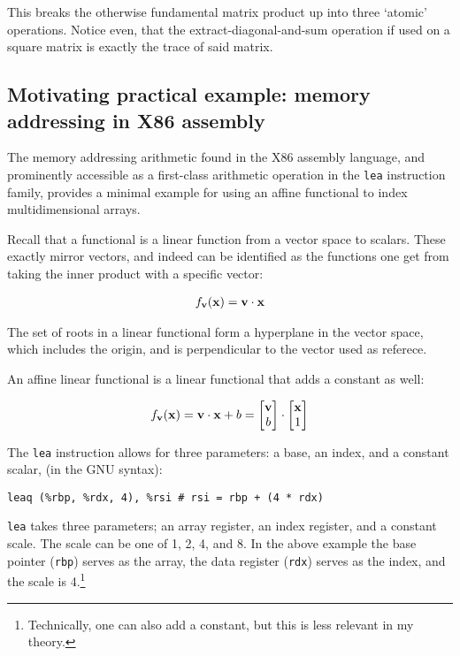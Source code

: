 \documentclass[a4paper,11pt,notitlepage]{article}
\begin{document}
This breaks the otherwise fundamental matrix product up into three `atomic' operations. Notice even,
that the extract-diagonal-and-sum operation if used on a square matrix is exactly the trace of said matrix.

\subsection{Motivating practical example: memory addressing in X86 assembly}

The memory addressing arithmetic found in the X86 assembly language, and prominently
accessible as a first-class arithmetic operation in the \texttt{lea} instruction family,
provides a minimal example for using an affine functional to index multidimensional arrays.

Recall that a functional is a linear function from a vector space to scalars. These exactly mirror
vectors, and indeed can be identified as the functions one get from taking the inner product with
a specific vector:

\begin{align*}
  f_{\bm{\mathrm{v}}}(\bm{\mathrm{x}}) = \bm{\mathrm{v}} \cdot \bm{\mathrm{x}}
\end{align*}

The set of roots in a linear functional form a hyperplane in the vector space, which includes the origin,
and is perpendicular to the vector used as referece.

An affine linear functional is a linear functional that adds a constant as well:

\begin{align*}
  f_{\bm{\mathrm{v}}}(\bm{\mathrm{x}}) = \bm{\mathrm{v}} \cdot \bm{\mathrm{x}} + b =
  \begin{bmatrix} \bm{\mathrm{v}} \\ b \end{bmatrix}\cdot\begin{bmatrix} \bm{\mathrm{x}} \\ 1 \end{bmatrix}
\end{align*}

The \texttt{lea} instruction allows for three parameters: a base, an index, and a constant scalar,
(in the GNU syntax):

\begin{lstlisting}[style=x86_64]
        leaq (%rbp, %rdx, 4), %rsi # rsi = rbp + (4 * rdx)
\end{lstlisting}

\texttt{lea} takes three parameters; an array register, an index register,
and a constant scale. The scale can be one of 1, 2, 4, and 8. In the above example the
base pointer (\texttt{rbp}) serves as the array, the data register (\texttt{rdx}) serves
as the index, and the scale is 4.\footnote{Technically, one can also add a constant, but
this is less relevant in my theory.}
\end{document}
